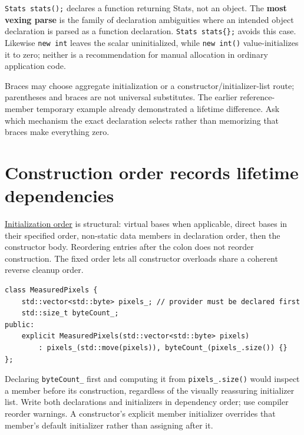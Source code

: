 \texttt{Stats\ stats();} declares a function returning Stats, not an object. The \textbf{most vexing parse} is the family of declaration ambiguities where an intended object declaration is parsed as a function declaration. \texttt{Stats\ stats\{\};} avoids this case. Likewise \texttt{new\ int} leaves the scalar uninitialized, while \texttt{new\ int()} value-initializes it to zero; neither is a recommendation for manual allocation in ordinary application code.

Braces may choose aggregate initialization or a constructor/initializer-list route; parentheses and braces are not universal substitutes. The earlier reference-member temporary example already demonstrated a lifetime difference. Ask which mechanism the exact declaration selects rather than memorizing that braces make everything zero.

\section{Construction order records lifetime dependencies}\label{01-foundations-i-ch003-construction-order-records-lifetime-dependencies}

\hypertarget{01-foundations-i-ch003-construction-order-records-lifetime-dependencies}{}

\hyperref[appendix-3cb49709605a]{Initialization order} is structural: virtual bases when applicable, direct bases in their specified order, non-static data members in declaration order, then the constructor body. Reordering entries after the colon does not reorder construction. The fixed order lets all constructor overloads share a coherent reverse cleanup order.

\begin{verbatim}
class MeasuredPixels {
    std::vector<std::byte> pixels_; // provider must be declared first
    std::size_t byteCount_;
public:
    explicit MeasuredPixels(std::vector<std::byte> pixels)
        : pixels_(std::move(pixels)), byteCount_(pixels_.size()) {}
};
\end{verbatim}

Declaring \texttt{byteCount\_} first and computing it from \texttt{pixels\_.size()} would inspect a member before its construction, regardless of the visually reassuring initializer list. Write both declarations and initializers in dependency order; use compiler reorder warnings. A constructor's explicit member initializer overrides that member's default initializer rather than assigning after it.

